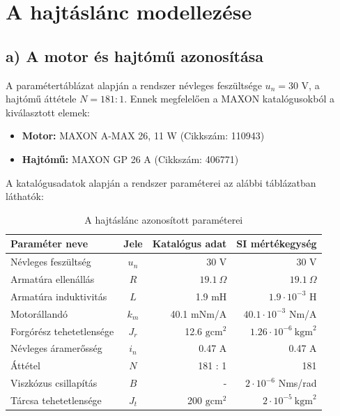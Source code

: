 \section{A hajtáslánc modellezése}
\subsection{a) A motor és hajtómű azonosítása}
A paramétertáblázat alapján a rendszer névleges feszültsége $u_n = 30\text{ V}$, a hajtómű áttétele $N = 181:1$. Ennek megfelelően a MAXON katalógusokból a kiválasztott elemek:
\begin{itemize}
    \item \textbf{Motor:} MAXON A-MAX 26, 11 W (Cikkszám: 110943)
    \item \textbf{Hajtómű:} MAXON GP 26 A (Cikkszám: 406771)
\end{itemize}

A katalógusadatok alapján a rendszer paraméterei az alábbi táblázatban láthatók:

\begin{table}[H]
    \centering
    \begin{tabular}{|l|c|r|r|}
        \hline
        \textbf{Paraméter neve}  & \textbf{Jele} & \textbf{Katalógus adat} & \textbf{SI mértékegység}           \\ \hline
        Névleges feszültség      & $u_n$         & 30 V                    & 30 V                               \\ \hline
        Armatúra ellenállás      & $R$           & $19.1\ \Omega$          & $19.1\ \Omega$                     \\ \hline
        Armatúra induktivitás    & $L$           & 1.9 mH                  & $1.9 \cdot 10^{-3}$ H              \\ \hline
        Motorállandó             & $k_m$         & 40.1 mNm/A              & $40.1 \cdot 10^{-3}$ Nm/A          \\ \hline
        Forgórész tehetetlensége & $J_r$         & 12.6 $\text{gcm}^2$     & $1.26 \cdot 10^{-6}\ \text{kgm}^2$ \\ \hline
        Névleges áramerősség     & $i_n$         & 0.47 A                  & 0.47 A                             \\ \hline
        Áttétel                  & $N$           & 181 : 1                 & 181                                \\ \hline
        Viszkózus csillapítás    & $B$           & -                       & $2 \cdot 10^{-6}$ Nms/rad          \\ \hline
        Tárcsa tehetetlensége    & $J_t$         & 200 $\text{gcm}^2$      & $2 \cdot 10^{-5}\ \text{kgm}^2$    \\ \hline
    \end{tabular}
    \caption{A hajtáslánc azonosított paraméterei}
\end{table}

